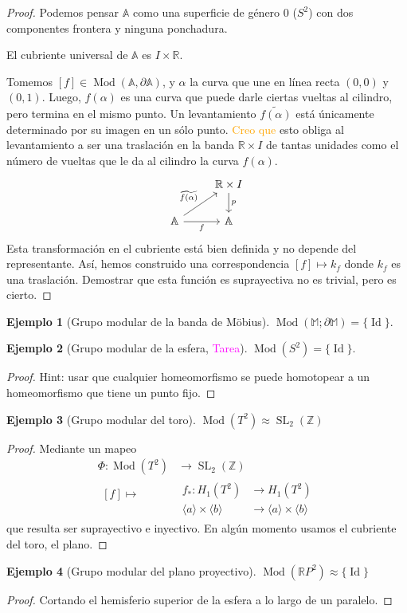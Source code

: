 \documentclass[spanish]{article}
\theoremstyle{definition}
\newtheorem*{ejem}{Ejemplo}
\newcommand{\R}{\mathbb{R}}
\newcommand{\Z}{\mathbb{Z}}
\newcommand{\A}{\mathbb{A}}
\newcommand{\M}{\mathbb{M}}
\DeclareMathOperator{\Id}{Id}
\DeclareMathOperator{\Mod}{Mod}
\DeclareMathOperator{\SL}{SL}
\begin{document}
	\begin{proof}
		Podemos pensar $\A$ como una superficie de género 0 ($S^2$) con dos componentes frontera y ninguna ponchadura.
		
		El cubriente universal de $\A$ es $I\times\R$.
		
		Tomemos $[f]\in\Mod(\A,\partial\A)$, y $\alpha$ la curva que une en línea recta $(0,0)$ y $(0,1)$. Luego, $f(\alpha)$ es una curva que puede darle ciertas vueltas al cilindro, pero termina en el mismo punto. Un levantamiento $\widetilde{f(\alpha)}$ está únicamente determinado por su imagen en un sólo punto. \textcolor{orange}{Creo que} esto obliga al levantamiento a ser una traslación en la banda $\R\times I$ de tantas unidades como el número de vueltas que le da al cilindro la curva $f(\alpha)$.
		\[\begin{tikzcd}
			&\R\times I\arrow[d,"p"]\\
			\A\arrow[ur,"\widetilde{f(\alpha)}"]\arrow[r,"f",swap]&\A
		\end{tikzcd}\]
		Esta transformación en el cubriente está bien definida y no depende del representante. Así, hemos construido una correspondencia $[f]\mapsto k_f$ donde $k_f$ es una traslación. Demostrar que esta función es suprayectiva no es trivial, pero es cierto.
	\end{proof}
	\begin{ejem}[Grupo modular de la banda de Möbius]
		$\Mod(\M;\partial\M)=\{\Id\}$.
	\end{ejem}
		\begin{ejem}[Grupo modular de la esfera, \textcolor{magenta}{Tarea}]
		$\Mod(S^2)=\{\Id\}$.
	\end{ejem}
	\begin{proof}
		Hint: usar que cualquier homeomorfismo se puede homotopear a un homeomorfismo que tiene un punto fijo.
	\end{proof}
	\begin{ejem}[Grupo modular del toro]
		$\Mod(T^2)\approx\SL_2(\Z)$
	\end{ejem}
	\begin{proof}
		Mediante un mapeo
		\begin{align*}
			\Phi:\Mod(T^2)&\to\SL_2(\Z)\\
			\begin{aligned}
				[f]\mapsto\\\\
			\end{aligned}&
			 \begin{aligned}
				f_*:H_1(T^2)&\to H_1(T^2)\\
				\langle a\rangle\times\langle b\rangle&\to\langle a\rangle\times\langle b\rangle
			\end{aligned}
		\end{align*}
		que resulta ser suprayectivo e inyectivo. En algún momento usamos el cubriente del toro, el plano.
	\end{proof}
	\begin{ejem}[Grupo modular del plano proyectivo]
		$\Mod(\R P^2)\approx\{\Id\}$
	\end{ejem}
	\begin{proof}
		Cortando el hemisferio superior de la esfera a lo largo de un paralelo.
	\end{proof}
	
\end{document}
